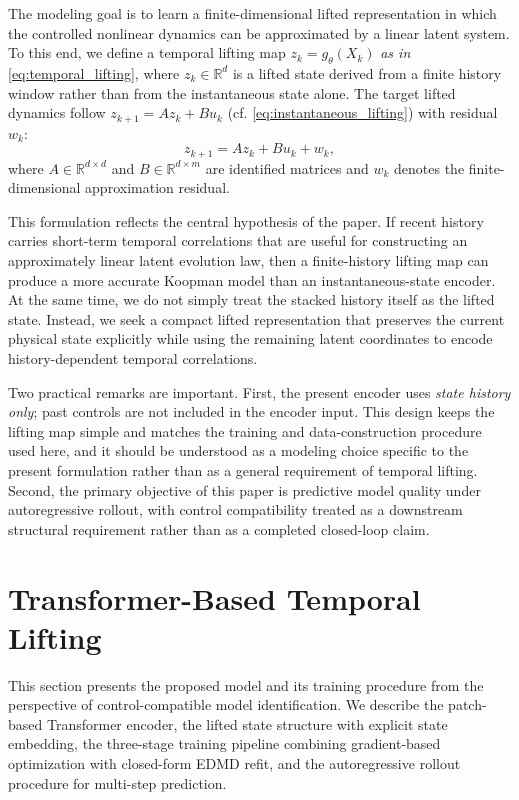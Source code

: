 \documentclass[journal]{IEEEtran}
\begin{document}
The modeling goal is to learn a finite-dimensional lifted representation in which the controlled nonlinear dynamics can be approximated by a linear latent system. To this end, we define a temporal lifting map $z_k = g_\theta(X_k)$ \emph{as in} \eqref{eq:temporal_lifting}, where $z_k \in \mathbb{R}^d$ is a lifted state derived from a finite history window rather than from the instantaneous state alone. The target lifted dynamics follow $z_{k+1}=Az_k+Bu_k$ (cf. \eqref{eq:instantaneous_lifting}) with residual $w_k$:
\begin{equation}
    z_{k+1} = A z_k + B u_k + w_k,
    \label{eq:lifted_dynamics}
\end{equation}
where $A \in \mathbb{R}^{d\times d}$ and $B \in \mathbb{R}^{d\times m}$ are identified matrices and $w_k$ denotes the finite-dimensional approximation residual.

This formulation reflects the central hypothesis of the paper. If recent history carries short-term temporal correlations that are useful for constructing an approximately linear latent evolution law, then a finite-history lifting map can produce a more accurate Koopman model than an instantaneous-state encoder. At the same time, we do not simply treat the stacked history itself as the lifted state. Instead, we seek a compact lifted representation that preserves the current physical state explicitly while using the remaining latent coordinates to encode history-dependent temporal correlations.

Two practical remarks are important. First, the present encoder uses \emph{state history only}; past controls are not included in the encoder input. This design keeps the lifting map simple and matches the training and data-construction procedure used here, and it should be understood as a modeling choice specific to the present formulation rather than as a general requirement of temporal lifting. Second, the primary objective of this paper is predictive model quality under autoregressive rollout, with control compatibility treated as a downstream structural requirement rather than as a completed closed-loop claim.

\section{Transformer-Based Temporal Lifting}
\label{sec:methodology}

This section presents the proposed model and its training procedure from the perspective of control-compatible model identification. We describe the patch-based Transformer encoder, the lifted state structure with explicit state embedding, the three-stage training pipeline combining gradient-based optimization with closed-form EDMD refit, and the autoregressive rollout procedure for multi-step prediction.
\end{document}
